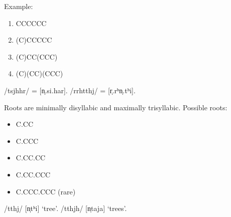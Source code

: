 \documentclass[
  a4paper,
]{article}
\providecommand{\tightlist}{%
  \setlength{\itemsep}{0pt}\setlength{\parskip}{0pt}}
\begin{document}
Example:

\begin{enumerate}
\def\labelenumi{\arabic{enumi}.}
\tightlist
\item
  CCCCCC
\item
  (C)CCCCC
\item
  (C)CC(CCC)
\item
  (C)(CC)(CCC)
\end{enumerate}

/tsjhhr/ = {[}n̩.si.har{]}. /rrhtthj/ = {[}r̩.rʰn̩.tʰi{]}.

Roots are minimally disyllabic and maximally trisyllabic. Possible
roots:

\begin{itemize}
\tightlist
\item
  C.CC
\item
  C.CCC
\item
  C.CC.CC
\item
  C.CC.CCC
\item
  C.CCC.CCC (rare)
\end{itemize}

/tthj/ {[}n̩tʰi{]} `tree'. /tthjh/ {[}n̩taja{]} `trees'.
\end{document}
